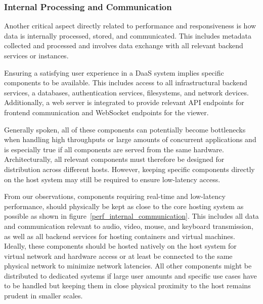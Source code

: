 \documentclass[runningheads]{llncs}
\begin{document}
\subsubsection{Internal Processing and Communication}
Another critical aspect directly related to performance and responsiveness
is how data is internally processed, stored, and communicated.
This includes metadata collected and processed
and involves data exchange with all relevant backend services or instances.

Ensuring a satisfying user experience in a DaaS system
implies specific components to be available.
This includes access to all infrastructural backend services,
a databases, authentication services, filesystems, and network devices.
Additionally, a web server is integrated to provide relevant API endpoints
for frontend communication and WebSocket endpoints for the viewer.

Generally spoken, all of these components can potentially become bottlenecks
when handling high throughputs or large amounts of concurrent applications
and is especially true if all components are served from the same hardware.
Architecturally, all relevant components
must therefore be designed for distribution across different hosts.
However, keeping specific components directly on the host system
may still be required to ensure low-latency access.

From our observations, components requiring real-time and low-latency performance,
should physically be kept as close to the core hosting system as possible
as shown in figure~\ref{perf_internal_communication}.
This includes all data and communication relevant to
audio, video, mouse, and keyboard transmission,
as well as all backend services for hosting containers and virtual machines.
Ideally, these components should be hosted natively on the host system
for virtual network and hardware access
or at least be connected to the same physical network
to minimize network latencies.
All other components might be distributed to dedicated systems
if large user amounts and specific use cases have to be handled
but keeping them in close physical proximity
to the host remains prudent in smaller scales.
\end{document}
